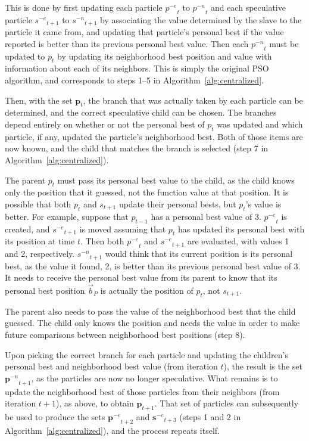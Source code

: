 \documentclass[letterpaper]{sig-alt-release2}
\newcommand{\alg}[1]{Algorithm~\ref{alg:#1}}
\providecommand{\pbest}{\ensuremath{\Vec{b}_P}}
\providecommand{\noeval}[1]{\ensuremath{#1^{-e}}}
\providecommand{\nonbest}[1]{\ensuremath{#1^{-n}}}
\providecommand{\p}{\ensuremath{p}}
\providecommand{\pset}{\ensuremath{\mathbf{p}}}
\providecommand{\s}{\ensuremath{s}}
\providecommand{\sset}{\ensuremath{\mathbf{s}}}
\begin{document}
This is done by first updating each particle $\noeval{\p}_t$ to
$\nonbest{\p}_t$ and each speculative particle $\noeval{\s}_{t+1}$ to
$\nonbest{\s}_{t+1}$ by associating the value determined by the slave to the
particle it came from, and updating that particle's personal best if the value
reported is better than its previous personal best value.  Then each
$\nonbest{\p}_t$ must be updated to $\p_t$ by updating its neighborhood best
position and value with information about each of its neighbors.  This is
simply the original PSO algorithm, and corresponds to steps 1--5 in
\alg{centralized}.

Then, with the set $\pset_t$, the branch that was actually taken by each
particle can be determined, and the correct speculative child can be chosen.
The branches depend entirely on whether or not the personal best of $p_t$ was
updated and which particle, if any, updated the particle's neighborhood best.
Both of those items are now known, and the child that matches the branch is
selected (step 7 in \alg{centralized}).

The parent $\p_t$ must pass its personal best value to the child, as the child
knows only the position that it guessed, not the function value at that
position.  It is possible that both $\p_t$ and $\s_{t+1}$ update their
personal bests, but $\p_t$'s value is better.  For example, suppose that
$\p_{t-1}$ has a personal best value of 3.  $\noeval{\p}_t$ is created, and
$\noeval{\s}_{t+1}$ is moved assuming that $\p_t$ has updated its personal
best with its position at time $t$.  Then both $\noeval{\p}_t$ and
$\noeval{\s}_{t+1}$ are evaluated, with values 1 and 2, respectively.
$\nonbest{\s}_{t+1}$ would think that its current position is its personal
best, as the value it found, 2, is better than its previous personal best
value of 3.  It needs to receive the personal best value from its parent to
know that its personal best position $\pbest$ is actually the position of
$\p_t$, not $\s_{t+1}$.

The parent also needs to pass the value of the neighborhood best that the child
guessed.  The child only knows the position and needs the value in order to
make future comparisons between neighborhood best positions (step 8).

Upon picking the correct branch for each particle and updating the children's
personal best and neighborhood best value (from iteration $t$), the result is
the set $\nonbest{\pset}_{t+1}$, as the particles are now no longer
speculative.  What remains is to update the neighborhood best of those
particles from their neighbors (from iteration $t+1$), as above, to obtain
$\pset_{t+1}$.  That set of particles can subsequently be used to produce the
sets $\noeval{\pset}_{t+2}$ and $\noeval{\sset}_{t+3}$ (steps 1 and 2 in
\alg{centralized}), and the process repeats itself.
\end{document}
